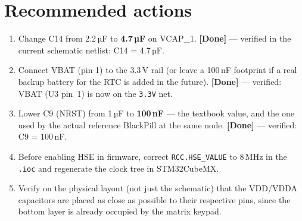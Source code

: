 \documentclass[11pt]{article}
\begin{document}
\section{Recommended actions}

\begin{enumerate}
  \item Change C14 from 2.2\,µF to \textbf{4.7\,µF} on VCAP\_1.
        \textcolor{okgreen}{\textbf{[Done]}} --- verified in the current
        schematic netlist: C14 = 4.7\,µF.
  \item Connect VBAT (pin 1) to the 3.3\,V rail (or leave a 100\,nF
        footprint if a real backup battery for the RTC is added in the
        future).
        \textcolor{okgreen}{\textbf{[Done]}} --- verified: VBAT (U3 pin~1)
        is now on the \texttt{3.3V} net.
  \item Lower C9 (NRST) from 1\,µF to \textbf{100\,nF} --- the textbook
        value, and the one used by the actual reference BlackPill at the
        same node.
        \textcolor{okgreen}{\textbf{[Done]}} --- verified: C9 = 100\,nF.
  \item Before enabling HSE in firmware, correct \texttt{RCC.HSE\_VALUE}
        to 8\,MHz in the \texttt{.ioc} and regenerate the clock tree in
        STM32CubeMX.
  \item Verify on the physical layout (not just the schematic) that the
        VDD/VDDA capacitors are placed as close as possible to their
        respective pins, since the bottom layer is already occupied by
        the matrix keypad.
\end{enumerate}
\end{document}

